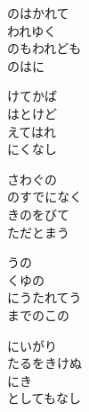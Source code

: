 \documentclass[10pt,b5j]{tarticle} %
\begin{document}
\vspace{1.5em} %
\newcommand{\linespace}{0.5em} %
\newcommand{\blocksize}{0.5\hsize} %
\begin{enumerate} %
    \begin{minipage}[c]{\blocksize}
    
        \vspace{\linespace}
        \item
        のはかれて\\
        われゆく\\
        のもわれども\\
        のはに
        
        \vspace{\linespace}
        \item
        けてかば\\
        はとけど\\
        えてはれ\\
        にくなし
        
        \vspace{\linespace}
        \item
        さわぐの\\
        のすでになく\\
        きのをびて\\
        ただとまう
        
        \vspace{\linespace}
        \item
        うの\\
        くゆの\\
        にうたれてう\\
        までのこの
        
        \vspace{\linespace}
        \item
        にいがり\\
        たるをきけぬ\\
        にき\\
        としてもなし
        

\end{minipage}
\end{enumerate}
\end{document}
